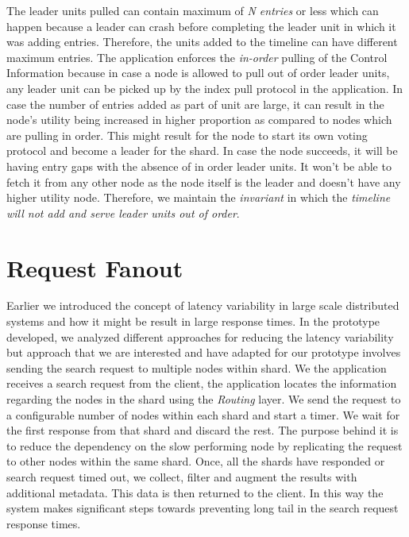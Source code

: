 \documentclass[a4paper,11pt]{kth-mag}
\begin{document}
\par The leader units pulled can contain maximum of \textit{N entries} or less which can happen because a leader can crash before completing the leader unit in which it was adding entries. Therefore, the units added to the timeline can have different maximum entries. The application enforces the \textit{in-order} pulling of the Control Information because in case a node is allowed to pull out of order leader units, any leader unit can be picked up by the index pull protocol in the application. In case the number of entries added as part of unit are large, it can result in the node's utility being increased in higher proportion as compared to nodes which are pulling in order. This might result for the node to start its own voting protocol and  become a leader for the shard. In case the node succeeds, it will be having entry gaps with the absence of in order leader units. It won't be able to fetch it from any other node as the node itself is the leader and doesn't have any higher utility node. Therefore, we maintain the \textit{invariant} in which the \textit{timeline will not add and serve leader units out of order}.






\section{Request Fanout}

Earlier we introduced the concept of latency variability in large scale distributed systems and how it might be result in large response times. In the prototype developed, we analyzed different approaches for reducing the latency variability but
approach that we are interested and have adapted for our prototype involves sending the search request to multiple nodes within shard. We the application receives a search request from the client, the application locates the information regarding the nodes in the shard using the \textit{Routing} layer. We send the request to a configurable number of nodes within each shard and start a timer. We wait for the first response from that shard and discard the rest. The purpose behind it is to reduce the dependency on the slow performing node by replicating the request to other nodes within the same shard. Once, all the shards have responded or search request timed out, we collect, filter and augment the results with additional metadata. This data is then returned to the client. In this way the system makes significant steps towards preventing long tail in the search request response times.
\end{document}
